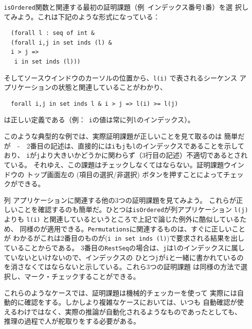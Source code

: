 \documentclass[\pformat,12pt]{jarticle}
\newcommand{\aaa}{\tt }
\newcommand{\guicmd}[1]{{\gt #1}}
\begin{document}
{\aaa isOrdered}関数と関連する最初の証明課題（例\ インデックス番号1番）を選
択してみよう。これは下記のような形式になっている：


\begin{verbatim}
  (forall l : seq of int &
  (forall i,j in set inds (l) &
  i > j =>
   i in set inds (l)))
\end{verbatim}


そして\guicmd{ソースウインドウ}のカーソルの位置から、\verb+l(i)+ で表されるシーケンス
 アプリケーションの状態と関連していることがわかり、

\begin{verbatim}
  forall i,j in set inds l & i > j => l(i) >= l(j)
\end{verbatim}

は正しい定義である（例：\ {\aaa i}の値は常に列{\aaa l}のインデックス）。

このような典型的な例では、実際証明課題が正しいことを見て取るのは
簡単だが　-　2番目の記述は、直接的には{\aaa i}も{\aaa j}も{\aaa l}のインデックスであることを示しており、
{\aaa i}が{\aaa j}より大きいかどうかに関わらず（3行目の記述）不適切であるとされている。
それゆえ、この課題はチェックしなくてはならない。\guicmd{証明課題ウインドウ}の
トップ画面左の 
(\guicmd{項目の選択/非選択}) ボタンを押すことによってチェックができる。

列 アプリケーションに関連する他の3つの証明課題を見てみよう。
これらが正しいことを確認するのも簡単だ。ひとつは{\aaa isOrdered}が列アプリケーション
\verb+l(j)+ よりも \verb+l(i)+ と関連しているというところで上記で論じた例外に酷似しているため、
同様のが適用できる。{\aaa Permutations}に関連するものは、すぐに正しいことが
わかるがこれは2番目のものが(\verb+i in set inds (l)+)で要求される結果を出していることからである。
3番目の{\aaa RestSeq}の場合は、{\aaa j}は{\aaa l}のインデックスに属していないといけないので、インデックスの
ひとつ{\aaa j}が{\aaa i}と一緒に書かれているのを消さなくてはならないと示している。これら3つの証明課題
は同様の方法で選択し、マーク・チェックすることができる。

これらのようなケースでは、証明課題は機械的チェッカーを使って
実際には自動的に確認をする。しかしより複雑なケースにおいては、いつも
自動確認が使えるわけではなく、実際の推論が自動化されるようなものであったとしても、
推理の過程で人が舵取りをする必要がある。

\end{document}

